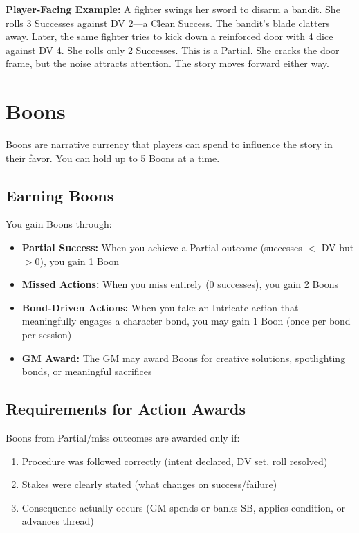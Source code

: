 \documentclass[11pt,twoside,openany]{book}
\begin{document}
\textbf{Player-Facing Example:} A fighter swings her sword to disarm a bandit. She rolls 3 Successes against DV 2—a Clean Success. The bandit's blade clatters away. Later, the same fighter tries to kick down a reinforced door with 4 dice against DV 4. She rolls only 2 Successes. This is a Partial. She cracks the door frame, but the noise attracts attention. The story moves forward either way.

\section*{Boons} 

Boons are narrative currency that players can spend to influence the story in their favor. You can hold up to 5 Boons at a time.

\subsection*{Earning Boons}

You gain Boons through:
\begin{itemize}
\item \textbf{Partial Success:} When you achieve a Partial outcome (successes $<$ DV but $> 0$), you gain 1 Boon
\item \textbf{Missed Actions:} When you miss entirely (0 successes), you gain 2 Boons
\item \textbf{Bond-Driven Actions:} When you take an Intricate action that meaningfully engages a character bond, you may gain 1 Boon (once per bond per session)
\item \textbf{GM Award:} The GM may award Boons for creative solutions, spotlighting bonds, or meaningful sacrifices
\end{itemize}

\subsection*{Requirements for Action Awards}

Boons from Partial/miss outcomes are awarded only if:
\begin{enumerate}
\item Procedure was followed correctly (intent declared, DV set, roll resolved)
\item Stakes were clearly stated (what changes on success/failure)
\item Consequence actually occurs (GM spends or banks SB, applies condition, or advances thread)
\end{enumerate}
\end{document}
